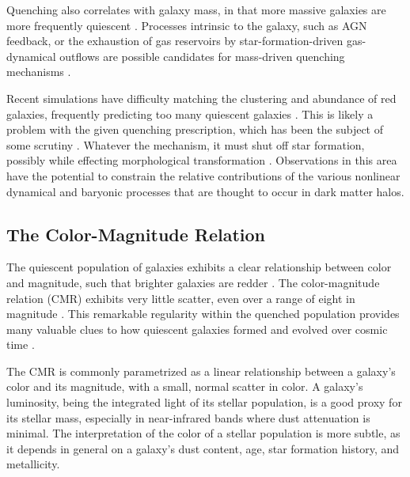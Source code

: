 Quenching also correlates with galaxy mass, in that more massive galaxies are more frequently quiescent \citep{Kauffmann:2004aa,Baldry:2006aa,Peng:2010aa}.
Processes intrinsic to the galaxy, such as AGN feedback, or the exhaustion of gas reservoirs by star-formation-driven gas-dynamical outflows are possible candidates for mass-driven quenching mechanisms \citep{McGee:2014aa,Balogh:2016aa}.

Recent simulations have difficulty matching the clustering and abundance of red galaxies, frequently predicting too many quiescent galaxies \citep{Coil:2008aa,Weinmann:2011aa,Vulcani:2014aa}.
This is likely a problem with the given quenching prescription, which has been the subject of some scrutiny \citep{McGee:2009aa,McGee:2011aa,Balogh:2016aa}.
Whatever the mechanism, it must shut off star formation, possibly while effecting morphological transformation \citep{Dressler:1980aa}.
Observations in this area have the potential to constrain the relative contributions of the various nonlinear dynamical and baryonic processes that are thought to occur in dark matter halos.

\subsection{The Color-Magnitude Relation}

The quiescent population of galaxies exhibits a clear relationship between color and magnitude, such that brighter galaxies are redder \citep{Bower:1992mb,van-Dokkum:1998wd,Baldry:2004aa,Bell:2004qe}.
The color-magnitude relation (CMR) exhibits very little scatter, even over a range of eight in magnitude \citep{Baldry:2004aa}.
This remarkable regularity within the quenched population provides many valuable clues to how quiescent galaxies formed and evolved over cosmic time \citep{Bower:1992mb,Peebles:2002aa}.

The CMR is commonly parametrized as a linear relationship between a galaxy's color and its magnitude, with a small, normal scatter in color.
A galaxy's luminosity, being the integrated light of its stellar population, is a good proxy for its stellar mass, especially in near-infrared bands where dust attenuation is minimal.
The interpretation of the color of a stellar population is more subtle, as it depends in general on a galaxy's dust content, age, star formation history, and metallicity.

